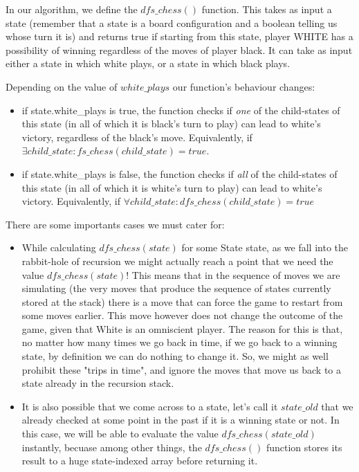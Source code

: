 In our algorithm, we define the $dfs\_chess()$ function. This takes as input a state (remember that 
a state is a board configuration and a boolean telling us whose turn it is) and returns true if
starting from this state, player WHITE has a possibility of winning regardless of the moves of player black. 
It can take as input either a state in which white plays, or a state in which black plays. 

Depending on the value of $white\_plays$ our function's behaviour changes:
\begin{itemize}
\item if state.white\_plays is true, the function checks if \emph{one} of the child-states of this state 
(in all of which it is black's turn to play) can lead to white's victory, regardless of the black's move.
Equivalently, if $\exists child\_state :  fs\_chess(child\_state) = true $.

\item if state.white\_plays is false, the function checks if \emph{all} of the child-states of this state
(in all of which it is white's turn to play) can lead to white's victory. Equivalently, if $\forall child\_state: dfs\_chess(child\_state) = true $
\end{itemize}

There are some importants cases we must cater for:
\begin{itemize}
\item While calculating $dfs\_chess(state)$ for some State state, as we fall into the rabbit-hole of recursion 
we might actually reach a point that we need the value $dfs\_chess(state)$! This means that in the sequence of moves we are
simulating (the very moves that produce the sequence of states currently stored at the stack) there is a move that can
force the game to restart from some moves earlier. This move however does not change the outcome of the game, given that
White is an omniscient player. The reason for this is that, no matter how many times we go back in time, if we go back to a
winning state, by definition we can do nothing to change it. So, we might as well prohibit these "trips in time", and ignore
the moves that move us back to a state already in the recursion stack.
\item It is also possible that we come across to a state, let's call it $state\_old$ that we already checked at some point in the past if it is a winning state or not. In this case, we will be able to evaluate the value $dfs\_chess(state\_old)$ 
instantly, becuase among other things, the $dfs\_chess()$ function stores its result to a huge state-indexed array before
returning it.
\end{itemize}

